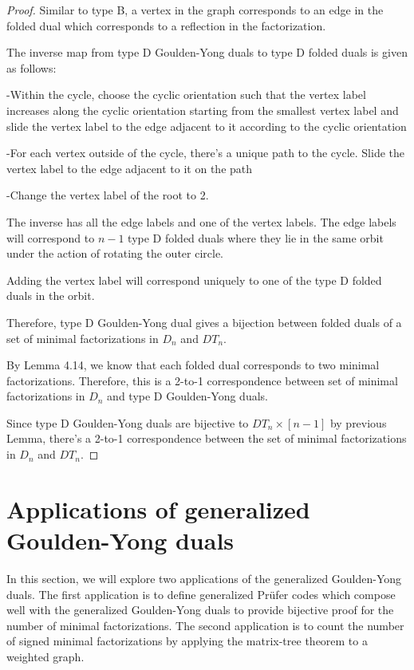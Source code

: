 \documentclass[11pt]{amsart}
\begin{document}
\begin{proof}
        Similar to type B, a vertex in the graph corresponds to an edge in the folded dual which corresponds to a reflection in the factorization.

    The inverse map from type D Goulden-Yong duals to type D folded duals is given as follows:

    -Within the cycle, choose the cyclic orientation such that the vertex label increases along the cyclic orientation starting from the smallest vertex label and slide the vertex label to the edge adjacent to it according to the cyclic orientation

    -For each vertex outside of the cycle, there's a unique path to the cycle. Slide the vertex label to the edge adjacent to it on the path

    -Change the vertex label of the root to 2.

    The inverse has all the edge labels and one of the vertex labels. The edge labels will correspond to $n-1$ type D folded duals where they lie in the same orbit under the action of rotating the outer circle.

    Adding the vertex label will correspond uniquely to one of the type D folded duals in the orbit.

    Therefore, type D Goulden-Yong dual gives a bijection between folded duals of a set of minimal factorizations in $D_n$ and $DT_n$.

    By Lemma 4.14, we know that each folded dual corresponds to two minimal factorizations. Therefore, this is a 2-to-1 correspondence between set of minimal factorizations in $D_n$ and type D Goulden-Yong duals.

    Since type D Goulden-Yong duals are bijective to $DT_n \times [n-1]$ by previous Lemma, there's a 2-to-1 correspondence between the set of minimal factorizations in $D_n$ and $DT_n$.
\end{proof}

\section{Applications of generalized Goulden-Yong duals}
In this section, we will explore two applications of the generalized Goulden-Yong duals. The first application is to define generalized Pr\"{u}fer codes which compose well with the generalized Goulden-Yong duals to provide bijective proof for the number of minimal factorizations. The second application is to count the number of signed minimal factorizations by applying the matrix-tree theorem to a weighted graph.
\end{document}
